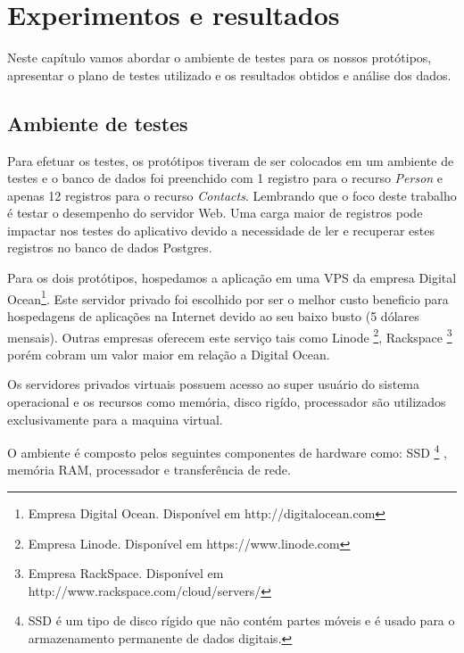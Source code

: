 
\chapter{Experimentos e resultados}
\label{experimentos-resultados}

\vspace{-1.9cm}


 Neste capítulo vamos abordar o ambiente de testes para os nossos protótipos, apresentar
 o plano de testes utilizado e os resultados obtidos e análise dos dados.

\section{Ambiente de testes}
\label{ambientedetestes}

  Para efetuar os testes, os protótipos tiveram de ser colocados em um ambiente de testes e o banco de dados foi preenchido
  com 1 registro para o recurso \textit{Person} e apenas 12 registros para o recurso \textit{Contacts}. Lembrando que o foco deste
  trabalho é testar o desempenho do servidor Web. Uma carga maior de registros pode impactar nos testes do aplicativo devido a necessidade
  de ler e recuperar estes registros no banco de dados Postgres.
  
  Para os dois protótipos, hospedamos a aplicação em uma VPS da empresa Digital Ocean\footnote[14]{Empresa Digital Ocean. Disponível em http://digitalocean.com}.
  Este servidor privado foi escolhido por ser o melhor custo beneficio para hospedagens de aplicações na Internet
  devido ao seu baixo busto (5 dólares mensais). Outras empresas oferecem este serviço
  tais como Linode \footnote[15]{Empresa Linode. Disponível em https://www.linode.com}, Rackspace \footnote[16]{Empresa RackSpace. Disponível em http://www.rackspace.com/cloud/servers/}
  porém cobram um valor maior em relação a Digital Ocean.

  Os servidores privados virtuais possuem acesso ao super usuário do sistema operacional e os recursos como memória, disco rigído, processador
  são utilizados exclusivamente para a maquina virtual.

  O ambiente é composto pelos seguintes componentes de hardware como: SSD \footnote[17]{SSD é um tipo de disco rígido que não contém partes móveis e é usado para o armazenamento permanente de dados digitais.}
  , memória RAM, processador e transferência de rede.

